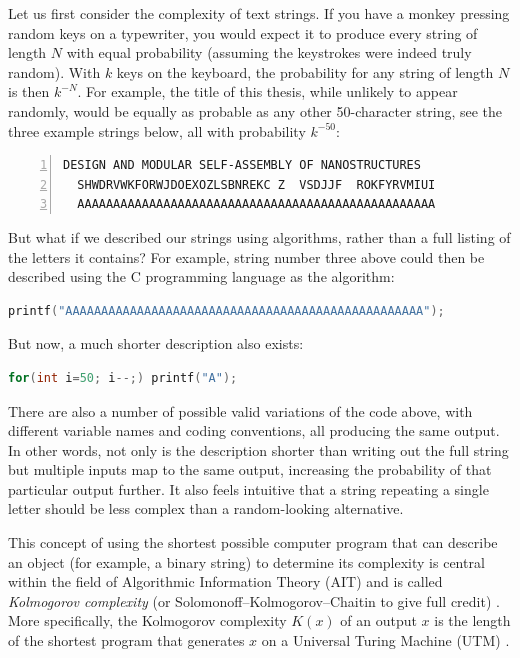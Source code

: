 Let us first consider the complexity of text strings. If you have a monkey pressing random keys on a typewriter, you would expect it to produce every string of length \(N\) with equal probability (assuming the keystrokes were indeed truly random). With \(k\) keys on the keyboard, the probability for any string of length \(N\) is then \(k^{-N}\). For example, the title of this thesis, while unlikely to appear randomly, would be equally as probable as any other 50-character string, see the three example strings below, all with probability \(k^{-50}\):
\begin{lstlisting}[numbers=left]
  DESIGN AND MODULAR SELF-ASSEMBLY OF NANOSTRUCTURES
  SHWDRVWKFORWJDOEXOZLSBNREKC Z  VSDJJF  ROKFYRVMIUI
  AAAAAAAAAAAAAAAAAAAAAAAAAAAAAAAAAAAAAAAAAAAAAAAAAA
\end{lstlisting}

But what if we described our strings using algorithms, rather than a full listing of the letters it contains? For example, string number three above could then be described using the C programming language as the algorithm:

\begin{lstlisting}[language=c]
printf("AAAAAAAAAAAAAAAAAAAAAAAAAAAAAAAAAAAAAAAAAAAAAAAAAA");
\end{lstlisting}

But now, a much shorter description also exists:

\begin{lstlisting}[language=c]
for(int i=50; i--;) printf("A");
\end{lstlisting}

There are also a number of possible valid variations of the code above, with different variable names and coding conventions, all producing the same output. In other words, not only is the description shorter than writing out the full string but multiple inputs map to the same output, increasing the probability of that particular output further. It also feels intuitive that a string repeating a single letter should be less complex than a random-looking alternative.

This concept of using the shortest possible computer program that can describe an object (for example, a binary string) to determine its complexity is central within the field of Algorithmic Information Theory (AIT) and is called \emph{Kolmogorov complexity} (or Solomonoff–Kolmogorov–Chaitin to give full credit) \cite{LiMing2019AitK}. More specifically, the Kolmogorov complexity \(K(x)\) of an output \(x\) is the length of the shortest program that generates \(x\) on a Universal Turing Machine (UTM) \cite{LiMing2019AitK}.


